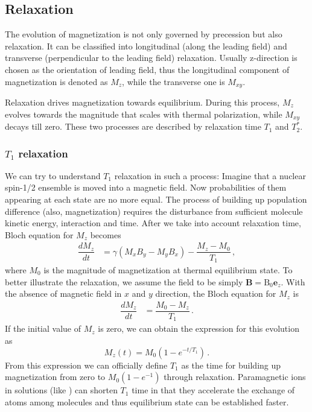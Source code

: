 \subsection{Relaxation}

The evolution of magnetization is not only governed by precession but also relaxation. It can be classified into longitudinal (along the leading field) and transverse (perpendicular to the leading field) relaxation. Usually z-direction is chosen as the orientation of leading field, thus the longitudinal component of magnetization is denoted as $M_z$, while the transverse one is $M_{xy}$. 

Relaxation drives magnetization towards equilibrium. During this process, $M_z$ evolves towards the magnitude that scales with thermal polarization, while $M_{xy}$ decays till zero. These two processes are described by relaxation time $T_1$ and $T_2^*$. 


\subsubsection{$T_1$ relaxation}

We can try to understand $T_1$ relaxation in such a process: Imagine that a nuclear spin-1/2 ensemble is moved into a magnetic field. %
Now probabilities of them appearing at each state are no more equal. The process of building up population difference (also, magnetization) requires the disturbance from sufficient molecule kinetic energy, interaction and time. 
After we take into account relaxation time, Bloch equation for $M_z$ becomes
\begin{align}
    \dfrac{d M_z}{dt} &= \gamma (M_x B_y - M_y B_x) - \dfrac{M_z - M_{0}}{T_1}\label{eq:BlochMz}\,,
\end{align}
where $M_{0}$ is the magnitude of magnetization at thermal equilibrium state. 
To better illustrate the relaxation, we assume the field to be simply $\mathbf{B} = \mathrm{B}_0 \mathbf{e}_z$. With the absence of magnetic field in $x$ and $y$ direction, the Bloch equation for $M_z$ is
\begin{align}
    \dfrac{d M_z}{dt} &= \dfrac{M_0 - M_z}{T_1}\,.
\end{align}
If the initial value of $M_z$ is zero, we can obtain the expression for this evolution as 
\begin{equation}
    M_z(t) = M_0(1 - e^{- t/T_1})\,. \label{eq:T_1relaxation_zeroMz0}
\end{equation}
From this expression we can officially define $T_1$ as the time for building up magnetization from zero to $M_0(1-e^{-1})$ through relaxation. Paramagnetic ions in solutions (like ) can shorten $T_1$ time in that they accelerate the exchange of atoms among molecules and thus equilibrium state can be established faster. 

